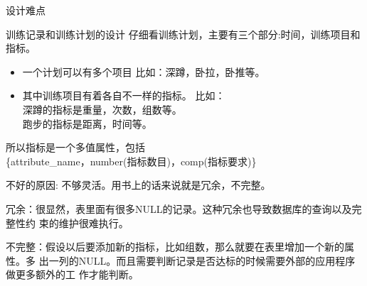 \documentclass{beamer}
\begin{document}
\begin{frame}{设计难点}

   {
    \begin{block}{训练记录和训练计划的设计}
      仔细看训练计划，主要有三个部分:时间，训练项目和指标。

      \begin{itemize}
      \item 一个计划可以有多个项目
        比如：深蹲，卧拉，卧推等。

      \item 其中训练项目有着各自不一样的指标。
        比如：\\
        深蹲的指标是重量，次数，组数等。\\
        跑步的指标是距离，时间等。
      \end{itemize}
    \end{block}
    
    所以指标是一个多值属性，包括\\
    \{attribute\_name，number(指标数目)，comp(指标要求)\}
  }
  

   {
    不好的原因: 不够灵活。用书上的话来说就是冗余，不完整。

    \vspace{3em}

    冗余：很显然，表里面有很多NULL的记录。这种冗余也导致数据库的查询以及完整性约
    束的维护很难执行。

    \vspace{3em}

    不完整：假设以后要添加新的指标，比如组数，那么就要在表里增加一个新的属性。多
    出一列的NULL。而且需要判断记录是否达标的时候需要外部的应用程序做更多额外的工
    作才能判断。
    
}
\end{frame}
\end{document}
